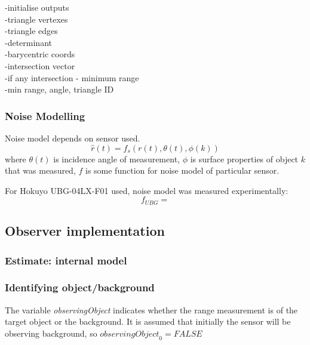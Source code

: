 	\begin{algorithm}[H]
	\SetAlgoLined
	
	-initialise outputs\\
	-triangle vertexes\\
	-triangle edges\\
	-determinant\\
	-barycentric coords\\
	-intersection vector\\
	-if any intersection - minimum range\\
		-min range, angle, triangle ID
	
	\caption{M{\"o}ller-Trumbore ray-triangle intersection algorithm}
	\end{algorithm}

	\subsubsection{Noise Modelling}
	Noise model depends on sensor used.
	\begin{equation}
		\hat{r}(t) = f_s(r(t),\theta(t),\phi(k))
	\end{equation}
	where $\theta(t)$ is incidence angle of measurement, $\phi$ is surface properties of object $k$ that was measured, $f$ is some function for noise model of particular sensor.
	
	For Hokuyo UBG-04LX-F01 used, noise model was measured experimentally:
	\begin{equation}
		f_{UBG} = 
	\end{equation}
	
\subsection{Observer implementation}
	\subsubsection{Estimate: internal model}
	\subsubsection{Identifying object/background}
		The variable \textit{observingObject} indicates whether the range measurement is of the target object or the background. It is assumed that initially the sensor will be observing background, so $\textit{observingObject}_0 = FALSE$

